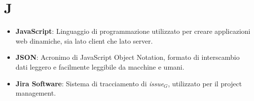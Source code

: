 \section{J}
\begin{itemize}
    \item \textbf{JavaScript}: Linguaggio di programmazione utilizzato per creare applicazioni web dinamiche, sia lato client che lato server.
    \item \textbf{JSON}: Acronimo di JavaScript Object Notation, formato di interscambio dati leggero e facilmente leggibile da macchine e umani.
    \item \textbf{Jira Software}: Sistema di tracciamento di \textit{issue}$_G$, utilizzato per il project management.
\end{itemize}
